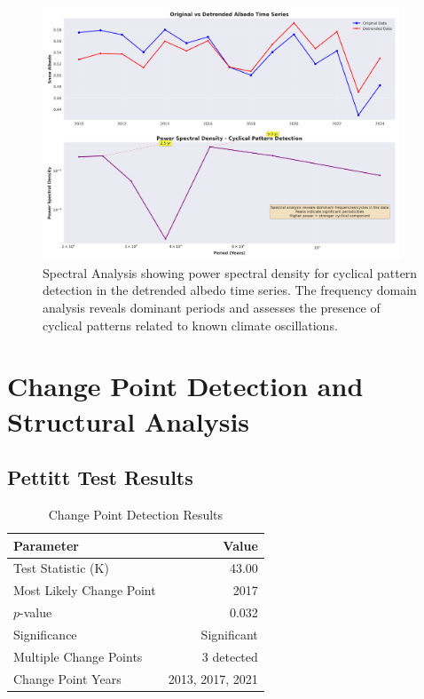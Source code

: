 \documentclass[12pt,a4paper]{article}
\newcommand{\pvalue}{$p$-value}
\begin{document}
\begin{figure}[H]
\centering
\includegraphics[width=0.95\textwidth]{../../results/advanced_plots/spectral_analysis.png}
\caption{Spectral Analysis showing power spectral density for cyclical pattern detection in the detrended albedo time series. The frequency domain analysis reveals dominant periods and assesses the presence of cyclical patterns related to known climate oscillations.}
\label{fig:spectral_analysis}
\end{figure}

\section{Change Point Detection and Structural Analysis}

\subsection{Pettitt Test Results}

\begin{table}[H]
\centering
\caption{Change Point Detection Results}
\label{tab:change_points}
\begin{tabular}{@{}lr@{}}
\toprule
\textbf{Parameter} & \textbf{Value} \\
\midrule
Test Statistic (K) & 43.00 \\
Most Likely Change Point & 2017 \\
\pvalue & 0.032 \\
Significance & Significant \\
Multiple Change Points & 3 detected \\
Change Point Years & 2013, 2017, 2021 \\
\bottomrule
\end{tabular}
\end{table}
\end{document}

